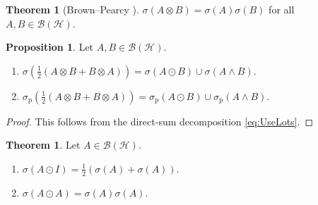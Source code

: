 \documentclass[10pt,reqno]{amsart}
\newcommand{\0}{{\color{lightgray}0}}
\newcommand{\B}{\mathcal{B}}
\newcommand{\h}{\mathcal{H}}
\theoremstyle{definition}
\newtheorem{Theorem}[equation]{Theorem}
\newtheorem{Proposition}[equation]{Proposition}
\numberwithin{equation}{section}
\begin{document}
\begin{Theorem}[Brown--Pearcy \cite{Brown&Pearcy}]\label{Theorem:BrownPearcy}
$\sigma(A\otimes B)=\sigma(A)\sigma(B)$ for all $A,B \in \B(\h)$.
\end{Theorem}

\begin{Proposition}\label{Proposition:SpectrumUnion}
Let $A,B \in \B(\h)$.  
\begin{enumerate}
\item $\sigma (\tfrac{1}{2}(A \otimes B + B \otimes A) ) = \sigma (A \odot B) \cup \sigma (A \wedge B)$.

\item $\sigma_{\textrm{p}} (\tfrac{1}{2}(A \otimes B + B \otimes A) ) = \sigma_{\textrm{p}} (A \odot B) \cup \sigma_{\textrm{p}} (A \wedge B)$.
\end{enumerate}
\end{Proposition}

\begin{proof}
This follows from the direct-sum decomposition \eqref{eq:UseLots}.
\end{proof}

\begin{Theorem}\label{Theorem:SpectrumSame}
Let $A \in \B(\h)$.  
\begin{enumerate}
\item $\sigma(A\odot I) = \frac{1}{2}(\sigma(A)+\sigma(A))$.
\item $\sigma(A\odot A) =  \sigma(A)\sigma(A)$.
\end{enumerate}
\end{Theorem}
\end{document}
